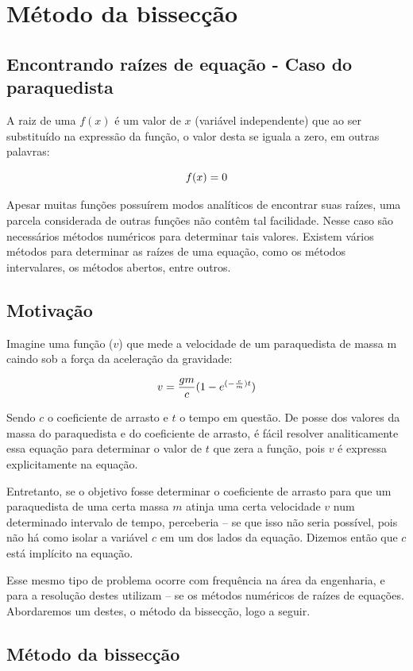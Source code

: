 \section{Método da bissecção}

\subsection{Encontrando raízes de equação - Caso do paraquedista}

A raiz de uma $f(x)$ é um valor de $x$ (variável independente) que ao ser substituído na expressão da função, o valor desta se iguala a zero, em outras palavras:

$$\Large f(x) = 0$$

Apesar muitas funções possuírem modos analíticos de encontrar suas raízes, uma parcela considerada de outras funções não contêm tal facilidade. Nesse caso são necessários métodos numéricos para determinar tais valores. Existem vários métodos para determinar as raízes de uma equação, como os métodos intervalares, os métodos abertos, entre outros.

\subsection{Motivação}

Imagine uma função ($v$) que mede a velocidade de um paraquedista de massa m caindo sob a força da aceleração da gravidade:

$$\Large v = \frac{gm}{c}(1-e^{(-\frac{c}{m})t})$$

Sendo $c$ o coeficiente de arrasto e $t$ o tempo em questão. De posse dos valores da massa do paraquedista e do coeficiente de arrasto, é fácil resolver analiticamente essa equação para determinar o valor de $t$ que zera a função, pois $v$ é expressa explicitamente na equação.

Entretanto, se o objetivo fosse determinar o coeficiente de arrasto para que um paraquedista de uma certa massa $m$ atinja uma certa velocidade $v$ num determinado intervalo de tempo, perceberia – se que isso não seria possível, pois não há como isolar a variável $c$ em um dos lados da equação. Dizemos então que $c$  está implícito na equação.

Esse mesmo tipo de problema ocorre com frequência na área da engenharia, e para a resolução destes utilizam – se os métodos numéricos de raízes de equações. Abordaremos um destes, o método da bissecção, logo a seguir.

\subsection{Método da bissecção}

